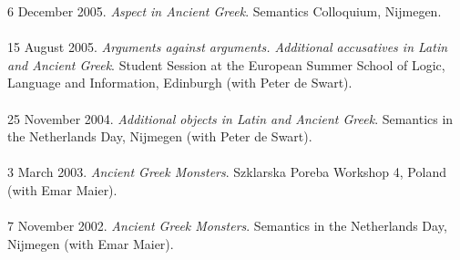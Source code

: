 \documentclass[a4paper,11pt]{article}
\begin{document}
6 December 2005. \emph{Aspect in Ancient Greek}. Semantics Colloquium, Nijmegen.\\\\
15 August 2005. \emph{Arguments against arguments. Additional
accusatives in Latin and Ancient Greek}. Student Session at the
European Summer School of Logic, Language and Information,
Edinburgh (with Peter de Swart).\\\\
25 November 2004. \emph{Additional objects in Latin and Ancient
Greek}. Semantics in the Netherlands Day, Nijmegen (with Peter de Swart).\\\\
3 March 2003. \emph{Ancient Greek Monsters}. Szklarska
Poreba Workshop 4, Poland (with Emar Maier).\\\\
7 November 2002. \emph{Ancient Greek Monsters}. Semantics in the Netherlands Day, Nijmegen (with Emar
Maier).\\

\end{document}
